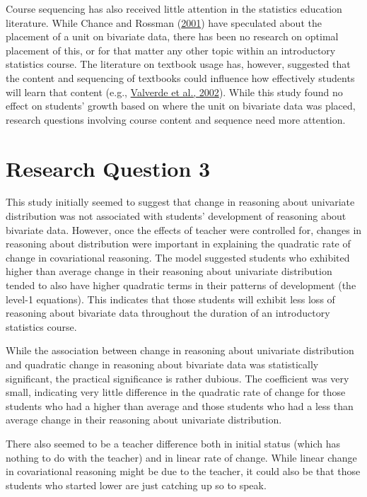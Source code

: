 \documentclass[11pt]{umnthesis}
\begin{document}
Course sequencing has also received little attention in the statistics education literature. While Chance and Rossman (\protect\hyperlink{ref-chance:2001}{2001}) have speculated about the placement of a unit on bivariate data, there has been no research on optimal placement of this, or for that matter any other topic within an introductory statistics course. The literature on textbook usage has, however, suggested that the content and sequencing of textbooks could influence how effectively students will learn that content (e.g., \protect\hyperlink{ref-valverde:2002}{Valverde et al., 2002}). While this study found no effect on students' growth based on where the unit on bivariate data was placed, research questions involving course content and sequence need more attention.

\hypertarget{research-question-3}{%
\section{Research Question 3}\label{research-question-3}}

This study initially seemed to suggest that change in reasoning about univariate distribution was not associated with students' development of reasoning about bivariate data. However, once the effects of teacher were controlled for, changes in reasoning about distribution were important in explaining the quadratic rate of change in covariational reasoning. The model suggested students who exhibited higher than average change in their reasoning about univariate distribution tended to also have higher quadratic terms in their patterns of development (the level-1 equations). This indicates that those students will exhibit less loss of reasoning about bivariate data throughout the duration of an introductory statistics course.

While the association between change in reasoning about univariate distribution and quadratic change in reasoning about bivariate data was statistically significant, the practical significance is rather dubious. The coefficient was very small, indicating very little difference in the quadratic rate of change for those students who had a higher than average and those students who had a less than average change in their reasoning about univariate distribution.

There also seemed to be a teacher difference both in initial status (which has nothing to do with the teacher) and in linear rate of change. While linear change in covariational reasoning might be due to the teacher, it could also be that those students who started lower are just catching up so to speak.
\end{document}
